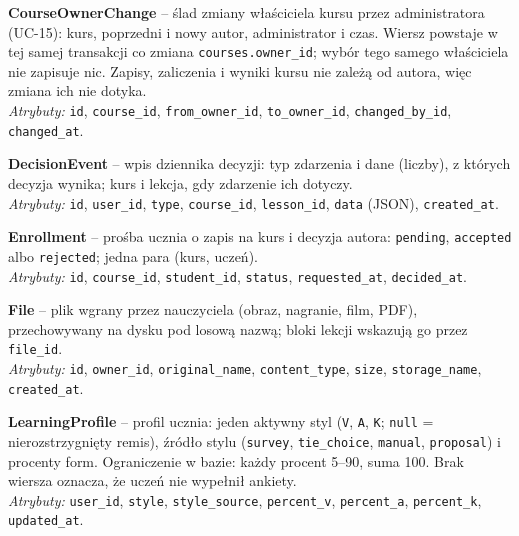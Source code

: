 \vspace{0.5em}
\textbf{CourseOwnerChange} -- ślad zmiany właściciela kursu przez administratora (UC-15): kurs, poprzedni i nowy autor, administrator i czas. Wiersz powstaje w tej samej transakcji co zmiana \texttt{courses.owner\_id}; wybór tego samego właściciela nie zapisuje nic. Zapisy, zaliczenia i wyniki kursu nie zależą od autora, więc zmiana ich nie dotyka. \\
\textit{Atrybuty:} \texttt{id}, \texttt{course\_id}, \texttt{from\_owner\_id}, \texttt{to\_owner\_id}, \texttt{changed\_by\_id}, \texttt{changed\_at}.

\vspace{0.5em}
\textbf{DecisionEvent} -- wpis dziennika decyzji: typ zdarzenia i dane (liczby), z których decyzja wynika; kurs i lekcja, gdy zdarzenie ich dotyczy. \\
\textit{Atrybuty:} \texttt{id}, \texttt{user\_id}, \texttt{type}, \texttt{course\_id}, \texttt{lesson\_id}, \texttt{data} (JSON), \texttt{created\_at}.

\vspace{0.5em}
\textbf{Enrollment} -- prośba ucznia o zapis na kurs i decyzja autora: \texttt{pending}, \texttt{accepted} albo \texttt{rejected}; jedna para (kurs, uczeń). \\
\textit{Atrybuty:} \texttt{id}, \texttt{course\_id}, \texttt{student\_id}, \texttt{status}, \texttt{requested\_at}, \texttt{decided\_at}.

\vspace{0.5em}
\textbf{File} -- plik wgrany przez nauczyciela (obraz, nagranie, film, PDF), przechowywany na dysku pod losową nazwą; bloki lekcji wskazują go przez \texttt{file\_id}. \\
\textit{Atrybuty:} \texttt{id}, \texttt{owner\_id}, \texttt{original\_name}, \texttt{content\_type}, \texttt{size}, \texttt{storage\_name}, \texttt{created\_at}.

\vspace{0.5em}
\textbf{LearningProfile} -- profil ucznia: jeden aktywny styl (\texttt{V}, \texttt{A}, \texttt{K}; \texttt{null} = nierozstrzygnięty remis), źródło stylu (\texttt{survey}, \texttt{tie\_choice}, \texttt{manual}, \texttt{proposal}) i procenty form. Ograniczenie w bazie: każdy procent 5--90, suma 100. Brak wiersza oznacza, że uczeń nie wypełnił ankiety. \\
\textit{Atrybuty:} \texttt{user\_id}, \texttt{style}, \texttt{style\_source}, \texttt{percent\_v}, \texttt{percent\_a}, \texttt{percent\_k}, \texttt{updated\_at}.

